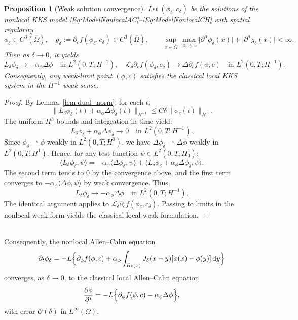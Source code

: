 \documentclass[]{article}
\newtheorem{proposition}{Proposition}[section]
\newcommand{\dy}{\,\textup{d}y}
\begin{document}
\begin{proposition}[Weak solution convergence]\label{prop:weak_limit}
	Let $(\phi_\delta,c_\delta)$ be the  solutions of the nonlocal KKS model \eqref{Eq:ModelNonlocalAC}--\eqref{Eq:ModelNonlocalCH} with spatial regularity
	\[
	\phi_\delta \in
	C^3(\overline\Omega),\quad g_\delta := \partial_c f(\phi_\delta,c_\delta)
	\in
	C^3(\overline\Omega),
	\qquad
	\sup_{x\in\overline\Omega}\max_{|\alpha|\le3}
	\bigl|\partial^\alpha\phi_\delta(x)\bigr|
	+
	\bigl|\partial^\alpha g_\delta(x)\bigr|
	< \infty.
	\] 
	Then as $\delta\to0$, it yields
	\[
	L_\delta\phi_\delta
	\to
	-\alpha_\phi\Delta\phi
	\quad\text{in }L^2(0,T;H^{-1}),
	\quad
	\mathcal{L}_\delta \partial_c f (\phi_\delta,c_\delta)
	\to
	\Delta \partial_c f (\phi,c)
	\quad\text{in }L^2(0,T;H^{-1}).
	\]
	Consequently, any weak-limit point $(\phi,c)$ satisfies the classical local KKS system in the $H^{-1}$-weak sense.
\end{proposition}

\begin{proof}
	By Lemma~\ref{lem:dual_norm}, for each \(t\),
	\[
	\|L_\delta\phi_\delta(t)+\alpha_\phi\Delta\phi_\delta(t)\|_{H^{-1}} \le C\delta\|\phi_\delta(t)\|_{H^3}.
	\]
	The uniform \(H^3\)-bounds and integration in time yield:
	\[
	L_\delta\phi_\delta + \alpha_\phi\Delta\phi_\delta \to 0 \quad \text{in } L^2(0,T;H^{-1}).
	\]
	Since \(\phi_\delta \rightharpoonup \phi\) weakly in \(L^2(0,T; H^3)\), we have \(\Delta \phi_\delta \rightharpoonup \Delta \phi\) weakly in \(L^2(0,T; H^1)\). Hence, for any test function \(\psi \in L^2(0,T; H^1_0)\):
	\[
	\langle L_\delta \phi_\delta, \psi \rangle = - \alpha_\phi \langle \Delta \phi_\delta, \psi \rangle + \langle L_\delta \phi_\delta + \alpha_\phi \Delta \phi_\delta, \psi \rangle.
	\]
	The second term tends to 0 by the convergence above, and the first term converges to \(-\alpha_\phi \langle \Delta \phi, \psi \rangle\) by weak convergence. Thus,
	\[
	L_\delta\phi_\delta \to -\alpha_\phi\Delta\phi \quad \text{in } L^2(0,T;H^{-1}).
	\]
	The identical argument applies to \(\mathcal{L}_\delta \partial_c f(\phi_\delta,c_\delta)\). Passing to limits in the nonlocal weak form yields the classical local weak formulation.
\end{proof}
\ \\
Consequently, the nonlocal Allen--Cahn equation
\[
\partial_t \phi_\delta
= -L\Bigl\{ \partial_\phi f(\phi,c)
+ \alpha_{\phi}\int_{B_{\delta}(x)}J_{\delta}(x-y)[\phi(x)-\phi(y)]\dy
\Bigr\}
\]
converges, as $\delta\to0$, to the classical local Allen--Cahn equation
\[
\frac{\partial \phi}{\partial t}
= -L\Bigl\{ \partial_\phi f(\phi,c) 
- \alpha_{\phi}\Delta\phi \Bigr\},
\]
with error $\mathcal{O}(\delta)$ in $L^\infty(\Omega)$.
\end{document}
